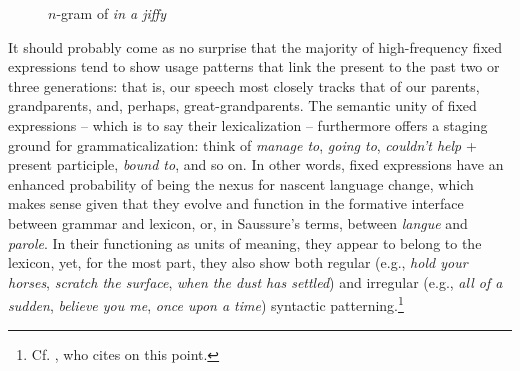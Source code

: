 \documentclass[english,output=paper,colorlinks,citecolor=brown]{../langscibook}
\begin{document}
\begin{figure}
\hspace*{1.65cm}
\caption{$n$-gram of \textit{in a jiffy}\label{fig:6:3}} %
\end{figure}

It should probably come as no surprise that the majority of high-frequency fixed expressions tend to show usage patterns that link the present to the past two or three generations: that is, our speech most closely tracks that of our parents, grandparents, and, perhaps, great-grandparents. The semantic unity of fixed expressions – which is to say their lexicalization – furthermore offers a staging ground for grammaticalization: think of \textit{manage to}, \textit{going to}, \textit{couldn’t help} + present participle, \textit{bound to}, and so on. In other words, fixed expressions have an enhanced probability of being the nexus for nascent language change, which makes sense given that they evolve and function in the formative interface between grammar and lexicon, or, in Saussure’s terms, between \textit{langue} and \textit{parole}. In their functioning as units of meaning, they appear to belong to the lexicon, yet, for the most part, they also show both regular (e.g., \textit{hold your horses}, \textit{scratch the surface}, \textit{when the dust has settled}) and irregular (e.g., \textit{all of a sudden}, \textit{believe you me}, \textit{once upon a time}) syntactic patterning.\footnote{Cf. \citet[2--3]{Wood2002}, who cites \citet[36]{RichardsSchmidt1983} on this point.}
\end{document}

